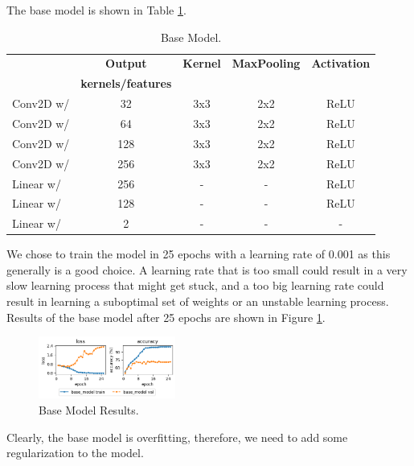 The base model is shown in Table \ref{tab:base_model}.
\begin{table}[H]
    \vspace*{-0.5cm}
    \centering
    \begin{tabular}{|l|c|c|c|c|}
    \hline
                & \textbf{Output}           & \textbf{Kernel}   & \textbf{MaxPooling}   & \textbf{Activation}   \\ 
                & \textbf{kernels/features} &                   &   &   \\ \hline
    Conv2D w/   & 32                        & 3x3                   & 2x2                   & ReLU                  \\ \hline
    Conv2D w/   & 64                        & 3x3                   & 2x2                   & ReLU                  \\ \hline
    Conv2D w/   & 128                       & 3x3                   & 2x2                   & ReLU                  \\ \hline
    Conv2D w/   & 256                       & 3x3                   & 2x2                   & ReLU                  \\ \hline
    Linear w/   & 256                       & -                     & -                     & ReLU                  \\ \hline
    Linear w/   & 128                       & -                     & -                     & ReLU                  \\ \hline
    Linear w/   & 2                         & -                     & -                     & -                     \\ \hline
    \end{tabular}
    \caption{Base Model.}
    \label{tab:base_model}
    \vspace*{-0.8cm}
\end{table}

We chose to train the model in 25 epochs with a learning rate of 0.001 as this generally is a good choice. A learning rate that is too small could result in a very slow learning process that might get stuck, and a too big learning rate could result in learning a suboptimal set of weights or an unstable learning process. Results of the base model after 25 epochs are shown in Figure \ref{fig:base_model_results}.
\begin{figure}[H]
    \vspace*{-0.7cm}
    \centering
    \includegraphics[width=0.4\textwidth]{figures/results_base_model.png}
    \caption{Base Model Results.}
    \label{fig:base_model_results}
    \vspace*{-0.7cm}
\end{figure}

Clearly, the base model is overfitting, therefore, we need to add some regularization to the model.